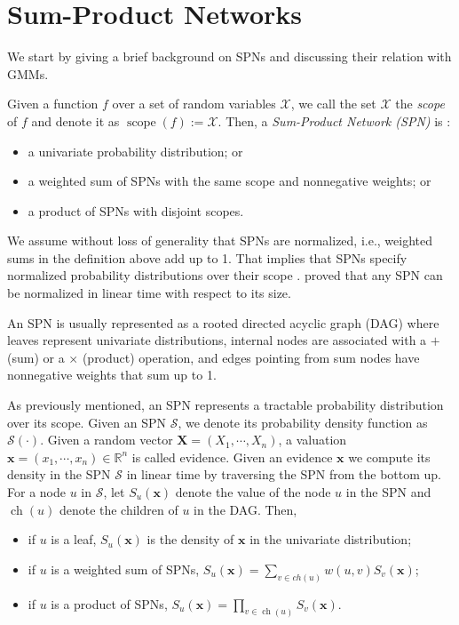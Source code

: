 \documentclass[12pt]{article}
\DeclareMathOperator*{\scope}{scope}
\DeclareMathOperator*{\ch}{ch}
\begin{document}
\section{Sum-Product Networks}
\label{sec:spn}

We start by giving a brief background on SPNs and discussing their relation with GMMs.

Given a function $f$ over a set of random variables $\mathcal{X}$, we call the set $\mathcal{X}$ the \emph{scope} of $f$ and denote it as $\scope(f) := \mathcal{X}$. Then, a \emph{Sum-Product Network (SPN)} is \cite{Gens2013}:

\begin{itemize}
    \item a univariate probability distribution; or
    \item a weighted sum of SPNs with the same scope and nonnegative weights; or
    \item a product of SPNs with disjoint scopes.
\end{itemize}

We assume without loss of generality that SPNs are normalized, i.e., weighted sums in the definition above add up to 1. That implies that SPNs specify normalized probability distributions over their scope \cite{Zhao2016}. \cite{Peharz2015} proved that any SPN can be normalized in linear time with respect to its size.

An SPN is usually represented as a rooted directed acyclic graph (DAG) where leaves represent univariate distributions, internal nodes are associated with a $+$ (sum) or a $\times$ (product) operation, and edges pointing from sum nodes have nonnegative weights that sum up to 1.

As previously mentioned, an SPN represents a tractable probability distribution over its scope. Given an SPN $\mathcal{S}$, we denote its probability density function as $\mathcal{S}(\cdot)$. Given a random vector $\mathbf{X} = (X_1, \cdots, X_n)$, a valuation $\mathbf{x} = (x_1, \cdots, x_n) \in \mathbb{R}^n$ is called evidence. Given an evidence $\mathbf{x}$ we compute its density in the SPN $\mathcal{S}$ in linear time by traversing the SPN from the bottom up. For a node $u$ in $\mathcal{S}$, let $S_u(\mathbf{x})$ denote the value of the node $u$ in the SPN and $\ch(u)$ denote the children of $u$ in the DAG. Then,

\begin{itemize}
    \item if $u$ is a leaf, $S_u(\mathbf{x})$ is the density of $\mathbf{x}$ in the univariate distribution;
    \item if $u$ is a weighted sum of SPNs, $S_u(\mathbf{x}) = \sum_{v \in ch(u)} w(u, v) S_v(\mathbf{x})$;
    \item if $u$ is a product of SPNs, $S_u(\mathbf{x}) = \prod_{v \in \ch(u)} S_v(\mathbf{x})$.
\end{itemize}
\end{document}
